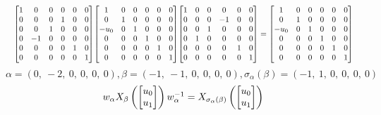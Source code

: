 \documentclass[11pt]{article}
\theoremstyle{definition}
\begin{document}
\[
\scaletoalign{\textwidth}{{\left[\begin{matrix}1 & 0 & 0 & 0 & 0 & 0\\0 & 0 & 0 & 1 & 0 & 0\\0 & 0 & 1 & 0 & 0 & 0\\0 & -1 & 0 & 0 & 0 & 0\\0 & 0 & 0 & 0 & 1 & 0\\0 & 0 & 0 & 0 & 0 & 1\end{matrix}\right]} {\left[\begin{matrix}1 & 0 & 0 & 0 & 0 & 0\\0 & 1 & 0 & 0 & 0 & 0\\- u_{0} & 0 & 1 & 0 & 0 & 0\\0 & 0 & 0 & 1 & 0 & 0\\0 & 0 & 0 & 0 & 1 & 0\\0 & 0 & 0 & 0 & 0 & 1\end{matrix}\right]} {\left[\begin{matrix}1 & 0 & 0 & 0 & 0 & 0\\0 & 0 & 0 & -1 & 0 & 0\\0 & 0 & 1 & 0 & 0 & 0\\0 & 1 & 0 & 0 & 0 & 0\\0 & 0 & 0 & 0 & 1 & 0\\0 & 0 & 0 & 0 & 0 & 1\end{matrix}\right]} = {\left[\begin{matrix}1 & 0 & 0 & 0 & 0 & 0\\0 & 1 & 0 & 0 & 0 & 0\\- u_{0} & 0 & 1 & 0 & 0 & 0\\0 & 0 & 0 & 1 & 0 & 0\\0 & 0 & 0 & 0 & 1 & 0\\0 & 0 & 0 & 0 & 0 & 1\end{matrix}\right]}}
\]
\[
\alpha = \left( 0, \  -2, \  0, \  0, \  0, \  0\right), \beta = \left( -1, \  -1, \  0, \  0, \  0, \  0\right), \sigma_{\alpha}(\beta) = \left( -1, \  1, \  0, \  0, \  0, \  0\right)
\]
\[
\scaletoalign{\textwidth}{w_{\alpha} X_{\beta}\left(\left[\begin{matrix}u_{0}\\u_{1}\end{matrix}\right]\right) w_{\alpha}^{-1} = X_{\sigma_{\alpha}\left(\beta\right)}\left(\left[\begin{matrix}u_{0}\\u_{1}\end{matrix}\right]\right)}
\]
\end{document}
